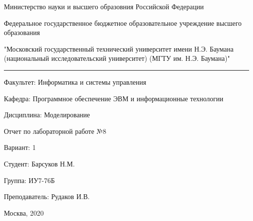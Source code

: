 \begin{center}
	Министерство науки и высшего образовния Российской Федерации
		
	Федеральное государственное бюджетное образовательное учреждение 
	высшего образования
	
	"Московский государственный технический университет имени Н.Э. Баумана (национальный исследовательский университет) (МГТУ им. Н.Э. Баумана)"
\end{center}

\hrule

\begin{flushleft}
	Факультет: Информатика и системы управления
	
	Кафедра: Программное обеспечение ЭВМ и информационные технологии
	
	Дисциплина: Моделирование
\end{flushleft}

\vspace{2cm}

\begin{center}
	Отчет по лабораторной работе №8
	
	Вариант: 1
\end{center}

\vspace{2cm}

\begin{flushleft}
	Студент: Барсуков Н.М.

	Группа: ИУ7-76Б
	
	Преподаватель: Рудаков И.В.
\end{flushleft}

\vspace*{\fill}
\begin{center}
	Москва, 2020
\end{center}